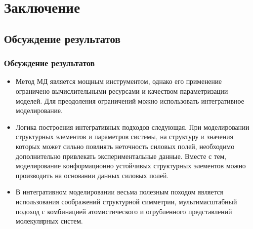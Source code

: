 \section{Заключение}
\subsection{Обсуждение результатов}
\begin{frame}
    \frametitle{Обсуждение результатов}
\begin{itemize}
 \item Метод МД является мощным инструментом, однако его применение ограничено вычислительными ресурсами и качеством параметризации моделей.
  Для преодоления ограничений можно использовать интегративное моделирование.

\item Логика построения интегративных подходов следующая. При моделировании структурных элементов и параметров системы, на структуру и значения которых может сильно повлиять неточность силовых полей, необходимо дополнительно привлекать экспериментальные данные. Вместе с тем, моделирование конформационно устойчивых структурных элементов можно производить на основании данных силовых полей. 

\item В интегративном моделировании весьма полезным походом является использования соображений структурной симметрии, мультимасштабный подоход с комбинацией атомистического и огрубленного представлений молекулярных систем.

\end{itemize}


\end{frame}

